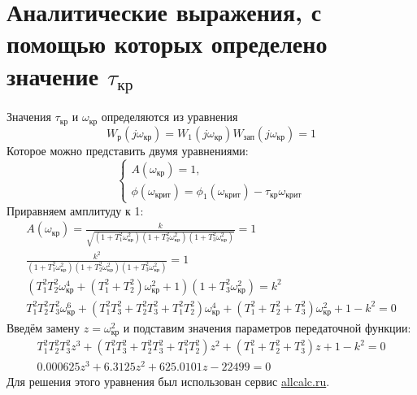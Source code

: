\documentclass[12pt]{article}
\begin{document}
\section{Аналитические выражения, с помощью
которых определено значение  $\tau_{кр}$}
Значения $\tau_{кр}$ и $\omega_{кр}$ определяются из уравнения 
\begin{equation}
    W_р(j\omega_{кр}) = W_1(j\omega_{кр})W_{зап}(j\omega_{кр}) = 1 
\end{equation}
Которое можно представить двумя уравнениями: 
\begin{equation}
    \begin{cases}
    A(\omega_{кр}) = 1, \\
    \phi(\omega_{крит}) = \phi_1(\omega_{крит}) - \tau_{кр}\omega_{крит}
    \end{cases}
\end{equation}
Приравняем амплитуду к 1:
\begin{equation}
\begin{gathered}
      A(\omega_{кр}) = \frac{k}{\sqrt{(1 + T_1^2\omega_{кр}^2)(1 + T_2^2\omega_{кр}^2)(1 + T_3^2\omega_{кр}^2)}} = 1\\
      \frac{k^2}{(1 + T_1^2\omega_{кр}^2)(1 + T_2^2\omega_{кр}^2)(1 + T_3^2\omega_{кр}^2)} = 1\\
      (T_1^2T_2^2\omega_{кр}^4 + (T_1^2 + T_2^2)\omega_{кр}^2 + 1)(1 + T_3^2\omega_{кр}^2) = k^2 \\
      T_1^2T_2^2T_3^2\omega_{кр}^6 + (T_1^2T_3^2 + T_2^2T_3^2 + T_1^2T_2^2)\omega_{кр}^4 + (T_1^2 + T_2^2 + T_3^2)\omega_{кр}^2 + 1 - k^2 = 0 
\end{gathered}
\end{equation}
Введём замену $z = \omega_{кр}^2$ и подставим значения параметров передаточной функции:
\begin{equation}
\begin{gathered}
    T_1^2T_2^2T_3^2z^3 + (T_1^2T_3^2 + T_2^2T_3^2 + T_1^2T_2^2)z^2 + (T_1^2 + T_2^2 + T_3^2)z + 1 - k^2 = 0  \\
   0.000625z^3 + 6.3125z^2 + 625.0101z - 22 499 = 0
\end{gathered}
\end{equation}
Для решения этого уравнения был использован сервис \href{https://allcalc.ru/node/62}{allcalc.ru}. \\
\end{document}
